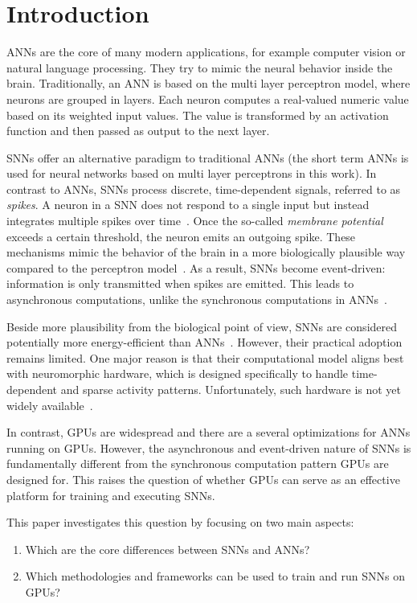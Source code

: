 \section{Introduction}\label{Sec:Introduction}
\Acp{ANN} are the core of many modern applications, for example computer vision or natural language processing.
They try to mimic the neural behavior inside the brain.
Traditionally, an \ac{ANN} is based on the multi layer perceptron model, where neurons are grouped in layers.
Each neuron computes a real-valued numeric value based on its weighted input values.
The value is transformed by an activation function and then passed as output to the next layer.

\Acp{SNN} offer an alternative paradigm to traditional \acp{ANN} (the short term \acp{ANN} is used for neural networks based on multi layer perceptrons in this work).
In contrast to \acp{ANN}, \acp{SNN} process discrete, time-dependent signals, referred to as \textit{spikes}.
A neuron in a \ac{SNN} does not respond to a single input but instead integrates multiple spikes over time~\cite{pietrzak_overview_2023}.
Once the so-called \textit{membrane potential} exceeds a certain threshold, the neuron emits an outgoing spike.
These mechanisms mimic the behavior of the brain in a more biologically plausible way compared to the perceptron model~\cite{maass_networks_1997}.
As a result, \acp{SNN} become event-driven: information is only transmitted when spikes are emitted.
This leads to asynchronous computations, unlike the synchronous computations in \acp{ANN}~\cite{pietrzak_overview_2023}.

Beside more plausibility from the biological point of view, \acp{SNN} are considered potentially more energy-efficient than \acp{ANN}~\cite{pietrzak_overview_2023}.
However, their practical adoption remains limited.
One major reason is that their computational model aligns best with neuromorphic hardware, which is designed specifically to handle time-dependent and sparse activity patterns.
Unfortunately, such hardware is not yet widely available~\cite{li_towards_2024}.

In contrast, \acp{GPU} are widespread and there are a several optimizations for \acp{ANN} running on \acp{GPU}.
However, the asynchronous and event-driven nature of \acp{SNN} is fundamentally different from the synchronous computation pattern \acp{GPU} are designed for.
This raises the question of whether \acp{GPU} can serve as an effective platform for training and executing \acp{SNN}.

This paper investigates this question by focusing on two main aspects:
\begin{enumerate}
    \item Which are the core differences between \acp{SNN} and \acp{ANN}?
    \item Which methodologies and frameworks can be used to train and run SNNs on \acp{GPU}?
\end{enumerate}

